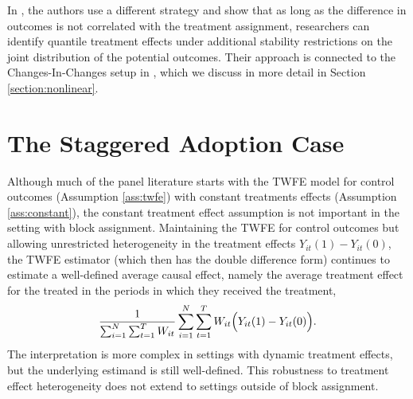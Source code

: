 \documentclass[letterpaper,12pt,leqno]{article}
\begin{document}
In \cite*{callaway2018quantile,callaway2019quantile}, the authors use a different strategy and show that as long as the difference in outcomes is not correlated with the treatment assignment, researchers can identify quantile treatment effects under additional stability restrictions on the joint distribution of the potential outcomes. Their approach is connected to the Changes-In-Changes setup in \citep{athey2006identification}, which we discuss in more detail in Section \ref{section:nonlinear}. 


\section{The Staggered Adoption Case}\label{section:staggered}



Although much of the panel literature starts with the TWFE model for control outcomes (Assumption \ref{ass:twfe}) with constant treatments effects (Assumption \ref{ass:constant}), the constant treatment effect assumption is not important in the setting with block assignment. Maintaining the TWFE for control outcomes but allowing unrestricted heterogeneity in the treatment effects $Y_{it}(1)-Y_{it}(0)$, the TWFE estimator (which then has the double difference form) continues to estimate a well-defined average causal effect, namely the average treatment effect for the treated in the periods in which they received the treatment,
\[ \frac{1}{\sum_{i=1}^N\sum_{t=1}^T W_{it}}\sum_{i=1}^N \sum_{t=1}^T W_{it}\Bigl( Y_{it}(1)-Y_{it}(0)\Bigr).\]
The interpretation is more complex in settings with dynamic treatment effects, but the underlying estimand is still well-defined. 
This robustness to treatment effect heterogeneity does not extend to settings outside of block assignment.
\end{document}
